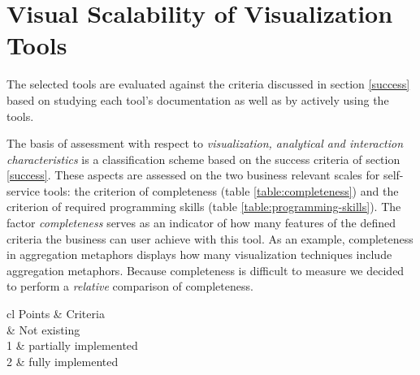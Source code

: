 \section{Visual Scalability of Visualization Tools}\label{tool:scalability}
The selected tools are evaluated against the criteria discussed in section \ref{success} based on studying each tool's documentation \cite{Qlik2017, Tableau2003, BI2017, Bostock2012} as well as by actively using the tools. 
\label{tool:classification}

The basis of assessment with respect to \textit{visualization, analytical and interaction characteristics} is a classification scheme based on the success criteria of section \ref{success}. These aspects are assessed on the two business relevant scales for self-service tools: the criterion of completeness  (table \ref{table:completeness}) and the criterion of required programming skills  (table \ref{table:programming-skills}). The factor \textit{completeness} serves as an indicator of how many features of the defined criteria the business can user achieve with this tool. As an example, completeness in aggregation metaphors displays how many visualization techniques include aggregation metaphors. Because completeness is difficult to measure we decided to perform a \textit{relative} comparison of completeness.

\begin{table}[H]
\centering
	\caption[Criterion Completeness]{Criteria Completeness: extend to which success criterion is implemented in tool}
	\label{table:completeness}
	\begin{tabu}{cl}
	\hline
	Points & Criteria\\
	 & Not existing\\
	1 & partially implemented \\
	2 & fully implemented \\
	\hline
	\end{tabu}
\end{table}

